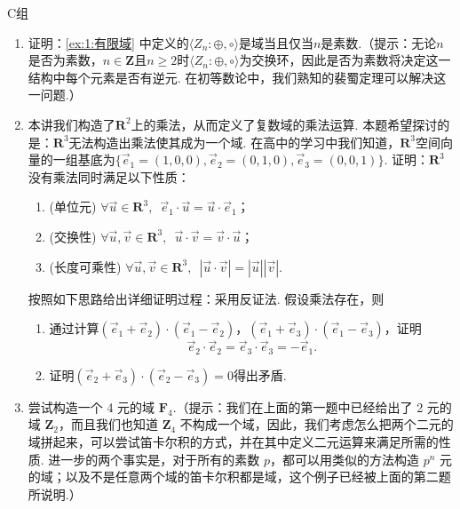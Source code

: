 \centerline{\heiti C组}
\begin{enumerate}
    \item 证明：\autoref{ex:1:有限域} 中定义的$\langle Z_n:\oplus,\circ\rangle$是域当且仅当$n$是素数.（提示：无论$n$是否为素数，$n\in\mathbf{Z}$且$n\geqslant 2$时$\langle Z_n:\oplus,\circ\rangle$为交换环，因此是否为素数将决定这一结构中每个元素是否有逆元. 在初等数论中，我们熟知的裴蜀定理可以解决这一问题.）

    \item 本讲我们构造了$\mathbf{R}^2$上的乘法，从而定义了复数域的乘法运算. 本题希望探讨的是：$\mathbf{R}^3$无法构造出乘法使其成为一个域. 在高中的学习中我们知道，$\mathbf{R}^3$空间向量的一组基底为$\{\vec{e}_1=(1,0,0),\vec{e}_2=(0,1,0),\vec{e}_3=(0,0,1)\}$. 证明：$\mathbf{R}^3$没有乘法同时满足以下性质：
          \begin{enumerate}
              \item (单位元) $\forall \vec{u}\in\mathbf{R}^3,\enspace\vec{e}_1\cdot \vec{u}=\vec{u}\cdot \vec{e}_1$；

              \item (交换性) $\forall \vec{u},\vec{v}\in\mathbf{R}^3,\enspace\vec{u}\cdot \vec{v}=\vec{v}\cdot \vec{u}$；

              \item (长度可乘性) $\forall \vec{u},\vec{v}\in\mathbf{R}^3,\enspace|\vec{u}\cdot\vec{v}|=|\vec{u}||\vec{v}|$.
          \end{enumerate}
          按照如下思路给出详细证明过程：采用反证法. 假设乘法存在，则
          \begin{enumerate}
              \item 通过计算$(\vec{e}_1+\vec{e}_2)\cdot(\vec{e}_1-\vec{e}_2)$，$(\vec{e}_1+\vec{e}_3)\cdot(\vec{e}_1-\vec{e}_3)$，证明\[\vec{e}_2\cdot\vec{e}_2=\vec{e}_3\cdot\vec{e}_3=-\vec{e}_1.\]

              \item 证明$(\vec{e}_2+\vec{e}_3)\cdot(\vec{e}_2-\vec{e}_3)=0$得出矛盾.
          \end{enumerate}

    \item 尝试构造一个 4 元的域 $\mathbf{F}_4$.（提示：我们在上面的第一题中已经给出了 2 元的域 $\mathbf{Z}_2$，而且我们也知道 $\mathbf{Z}_4$ 不构成一个域，因此，我们考虑怎么把两个二元的域拼起来，可以尝试笛卡尔积的方式，并在其中定义二元运算来满足所需的性质. 进一步的两个事实是，对于所有的素数 $p$，都可以用类似的方法构造 $p^n$ 元的域；以及不是任意两个域的笛卡尔积都是域，这个例子已经被上面的第二题所说明.）
\end{enumerate}
